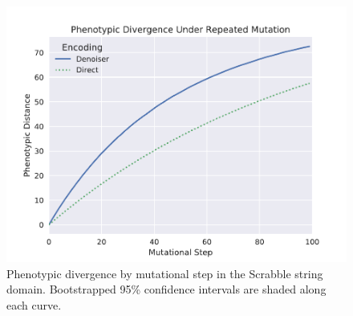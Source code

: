 \begin{figure}
  \includegraphics[width=0.85\linewidth]{img/results/scrabble_dist_vs_step}
  \caption{
    Phenotypic divergence by mutational step in the Scrabble string domain.
    Bootstrapped 95\% confidence intervals are shaded along each curve.
  }\label{fig:scrabble_dist_vs_step}
\end{figure}
